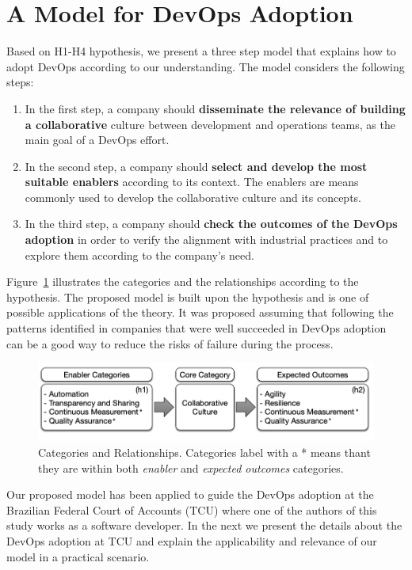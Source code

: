 \section{A Model for DevOps Adoption}\label{sec:case_study}

Based on H1-H4 hypothesis, we present a three step model that
explains how to adopt DevOps according to our understanding. The
model considers the following steps:

\begin{enumerate}
\item In the first step, a company should
  \textbf{disseminate the relevance of building a collaborative} culture between
  development and operations teams, as the main
  goal of a DevOps effort.

\item In the second step, a company should \textbf{select and develop
the most suitable enablers} according to its context. The enablers
are means commonly used to develop the collaborative culture and its concepts.

\item In the third step, a company should \textbf{check the outcomes of the
DevOps adoption} in order to verify the alignment with
industrial practices and to explore them according to the company's need.
\end{enumerate}

Figure~\ref{model} illustrates the categories and the
relationships according to the hypothesis. The proposed model is built upon
the hypothesis and is one of possible applications of the theory. It was proposed
assuming that following the patterns identified in companies that were
well succeeded in DevOps adoption can be a good way to reduce the risks of
failure during the process.

\begin{figure}[bht]
  \centering
  \includegraphics[width=.75\textwidth]{model.png}
  \caption{Categories and Relationships. Categories label with a * means
    thant they are within both \emph{enabler} and \emph{expected
    outcomes} categories.}
  \label{model}
\end{figure}


Our proposed model has been applied to guide the DevOps adoption at the
Brazilian Federal Court of Accounts (TCU) where one of the authors of this study
works as a software developer. In the next we present the details about the DevOps
adoption at TCU and explain the applicability and relevance of our model in a
practical scenario.
